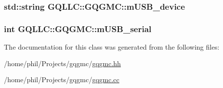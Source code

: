 \hypertarget{class_g_q_l_l_c_1_1_g_q_g_m_c_a358fe79ef3338d88ab193ca5f17d3770}{
\subsubsection[{m\-U\-S\-B\-\_\-device}]{\setlength{\rightskip}{0pt plus 5cm}std\-::string {\bf \-G\-Q\-L\-L\-C\-::\-G\-Q\-G\-M\-C\-::m\-U\-S\-B\-\_\-device}}}\label{class_g_q_l_l_c_1_1_g_q_g_m_c_a358fe79ef3338d88ab193ca5f17d3770}
\hypertarget{class_g_q_l_l_c_1_1_g_q_g_m_c_a5ff48a1e65964a979867d1eba2eb58b5}{
\subsubsection[{m\-U\-S\-B\-\_\-serial}]{\setlength{\rightskip}{0pt plus 5cm}int {\bf \-G\-Q\-L\-L\-C\-::\-G\-Q\-G\-M\-C\-::m\-U\-S\-B\-\_\-serial}}}\label{class_g_q_l_l_c_1_1_g_q_g_m_c_a5ff48a1e65964a979867d1eba2eb58b5}


\-The documentation for this class was generated from the following files\-:\begin{DoxyCompactItemize}
\item 
/home/phil/\-Projects/gqgmc/\hyperlink{gqgmc_8hh}{gqgmc.\-hh}\item 
/home/phil/\-Projects/gqgmc/\hyperlink{gqgmc_8cc}{gqgmc.\-cc}\end{DoxyCompactItemize}
